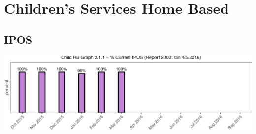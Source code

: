 \documentclass{article}\usepackage[]{graphicx}\usepackage[]{color}
\makeatletter
\def\maxwidth{ %
  \ifdim\Gin@nat@width>\linewidth
    \linewidth
  \else
    \Gin@nat@width
  \fi
}
\newenvironment{knitrout}{}{} %
\newenvironment{absolutelynopagebreak}
  {\par\nobreak\vfil\penalty0\vfilneg
   \vtop\bgroup}
  {\par\xdef\tpd{\the\prevdepth}\egroup
   \prevdepth=\tpd}
\makeatother
\begin{document}



\pagebreak
\section{Children's Services Home Based}
\subsection{IPOS}
\begin{knitrout}
\color{fgcolor}
\includegraphics[width=\maxwidth]{figure/hb_hist-1} 

\end{knitrout}
\end{document}
